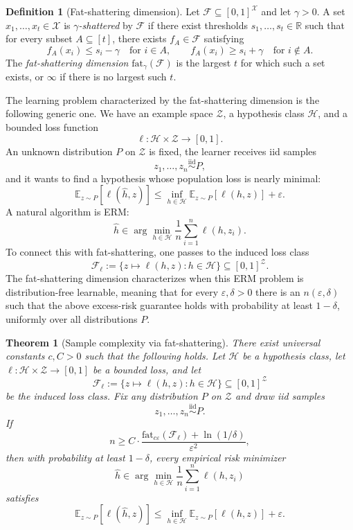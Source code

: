 \documentclass[11pt]{article}
\newtheorem{theorem}{Theorem}
\theoremstyle{definition}
\newtheorem{definition}{Definition}
\newcommand{\E}{\mathbb{E}}
\newcommand{\R}{\mathbb{R}}
\begin{document}
\begin{definition}[Fat-shattering dimension]
Let $\mathcal{F} \subseteq [0,1]^{\mathcal{X}}$ and let $\gamma > 0$. A set $x_1,\dots,x_t \in \mathcal{X}$ is \emph{$\gamma$-shattered} by $\mathcal{F}$ if there exist thresholds $s_1,\dots,s_t \in \R$ such that for every subset $A \subseteq [t]$, there exists $f_A \in \mathcal{F}$ satisfying
\[
f_A(x_i) \le s_i - \gamma
\quad \text{for } i \in A,
\qquad
f_A(x_i) \ge s_i + \gamma
\quad \text{for } i \notin A.
\]
The \emph{fat-shattering dimension} $\mathrm{fat}_{\gamma}(\mathcal{F})$ is the largest $t$ for which such a set exists, or $\infty$ if there is no largest such $t$.
\end{definition}

The learning problem characterized by the fat-shattering dimension is the following generic one. We have an example space $\mathcal{Z}$, a hypothesis class $\mathcal{H}$, and a bounded loss function
\[
\ell : \mathcal{H} \times \mathcal{Z} \to [0,1].
\]
An unknown distribution $P$ on $\mathcal{Z}$ is fixed, the learner receives iid samples
\[
z_1,\dots,z_n \overset{\mathrm{iid}}{\sim} P,
\]
and it wants to find a hypothesis whose population loss is nearly minimal:
\[
\E_{z \sim P}[\ell(\widehat{h},z)]
\le
\inf_{h \in \mathcal{H}} \E_{z \sim P}[\ell(h,z)] + \varepsilon.
\]
A natural algorithm is ERM:
\[
\widehat{h}
\in
\arg\min_{h \in \mathcal{H}} \frac{1}{n}\sum_{i=1}^n \ell(h,z_i).
\]
To connect this with fat-shattering, one passes to the induced loss class
\[
\mathcal{F}_{\ell}
:=
\{z \mapsto \ell(h,z) : h \in \mathcal{H}\}
\subseteq [0,1]^{\mathcal{Z}}.
\]
The fat-shattering dimension characterizes when this ERM problem is distribution-free learnable, meaning that for every $\varepsilon,\delta > 0$ there is an $n(\varepsilon,\delta)$ such that the above excess-risk guarantee holds with probability at least $1-\delta$, uniformly over all distributions $P$.

\begin{theorem}[Sample complexity via fat-shattering]
\label{thm:generic-fat-sample}
There exist universal constants $c,C > 0$ such that the following holds. Let $\mathcal{H}$ be a hypothesis class, let $\ell : \mathcal{H} \times \mathcal{Z} \to [0,1]$ be a bounded loss, and let
\[
\mathcal{F}_{\ell}
:=
\{z \mapsto \ell(h,z) : h \in \mathcal{H}\}
\subseteq [0,1]^{\mathcal{Z}}
\]
be the induced loss class. Fix any distribution $P$ on $\mathcal{Z}$ and draw iid samples
\[
z_1,\dots,z_n \overset{\mathrm{iid}}{\sim} P.
\]
If
\[
n
\ge
C \cdot \frac{\mathrm{fat}_{c\varepsilon}(\mathcal{F}_{\ell}) + \ln(1/\delta)}{\varepsilon^2},
\]
then with probability at least $1-\delta$, every empirical risk minimizer
\[
\widehat{h}
\in
\arg\min_{h \in \mathcal{H}} \frac{1}{n}\sum_{i=1}^n \ell(h,z_i)
\]
satisfies
\[
\E_{z \sim P}[\ell(\widehat{h},z)]
\le
\inf_{h \in \mathcal{H}} \E_{z \sim P}[\ell(h,z)] + \varepsilon.
\]
\end{theorem}
\end{document}
